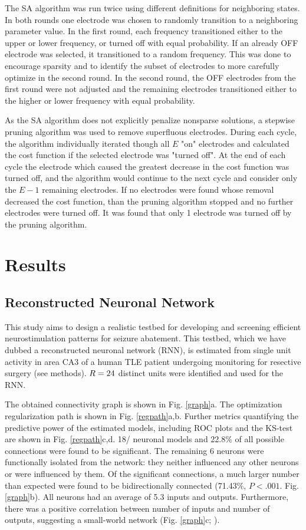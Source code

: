 \documentclass[11pt,a4paper,final]{article}
\begin{document}
The SA algorithm was run twice using different definitions for neighboring states.
In both rounds one electrode was chosen to randomly transition to a neighboring parameter value.
In the first round, each frequency transitioned either to the upper or lower  frequency, or turned off with equal probability.
If an already OFF electrode was selected, it transitioned to a random frequency.
This was done to encourage sparsity and to identify the subset of electrodes to more carefully optimize in the second round.
In the second round, the OFF electrodes from the first round were not adjusted and the remaining electrodes transitioned either to the higher or lower frequency with equal probability.

As the SA algorithm does not explicitly penalize nonsparse solutions, a stepwise pruning algorithm was used to remove superfluous electrodes.
During each cycle, the algorithm individually iterated though all $E$ "on" electrodes and calculated the cost function if the selected electrode was "turned off".
At the end of each cycle the electrode which caused the greatest decrease in the cost function was turned off, and the algorithm would continue to the next cycle and consider only the $E-1$ remaining electrodes.
If no electrodes were found whose removal decreased the cost function, than the pruning algorithm stopped and no further electrodes were turned off.
It was found that only 1 electrode was turned off by the pruning algorithm.


\section{Results \label{results}}

    \subsection{Reconstructed Neuronal Network}

This study aims to design a realistic testbed for developing and screening efficient neurostimulation patterns for seizure abatement.
This testbed, which we have dubbed a reconstructed neuronal network (RNN), is estimated from single unit activity in area CA3 of a human TLE patient undergoing monitoring for resective surgery (see methods).
$R=24{}$ distinct units were identified and used for the RNN. 

The obtained connectivity graph is shown in Fig. \ref{graph}a.
The optimization regularization path is shown in Fig. \ref{regpath}a,b.
Further metrics quantifying the predictive power of the estimated models, including ROC plots and the KS-test are shown in Fig. \ref{regpath}c,d.
18/\nn{} neuronal models and 22.8\% of all possible connections were found to be significant.
The remaining 6 neurons were functionally isolated from the network: they neither influenced any other neurons or were influenced by them.
Of the significant connections, a much larger number than expected were found to be bidirectionally connected (71.43\%, $P<.001$. Fig. \ref{graph}b).
All neurons had an average of 5.3 inputs and outputs.
Furthermore, there was a positive correlation between number of inputs and number of outputs, suggesting a small-world network (Fig. \ref{graph}c; \citet{sporns09,fallani14}).
\end{document}
